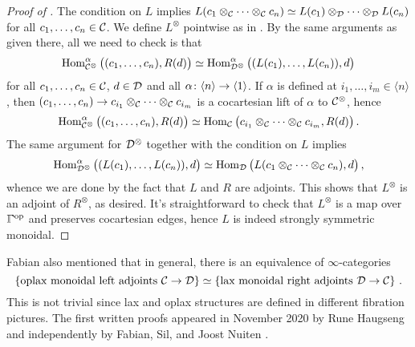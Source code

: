 \begin{proof}[Proof of ]
	The condition on $L$ implies $L(c_1\otimes_{\mathcal{C}}\dotsb\otimes_{\mathcal{C}} c_n)\simeq L(c_1)\otimes_{\mathcal{D}}\dotsb\otimes_{\mathcal{D}} L(c_n)$ for all $c_1,\dotsc,c_n\in\mathcal{C}$. We define $L^\otimes$ pointwise as in . By the same arguments as given there, all we need to check is that
	\begin{equation*}
		\operatorname{Hom}_{\mathcal{C}^\otimes}^\alpha\big((c_1,\dotsc,c_n),R(d)\big)\simeq \operatorname{Hom}_{\mathcal{D}^\otimes}^\alpha\big((L(c_1),\dotsc,L(c_n)),d\big)
	\end{equation*}
	for all $c_1,\dotsc,c_n\in\mathcal{C}$, $d\in \mathcal{D}$ and all $\alpha\colon \langle n\rangle \morphism\langle 1\rangle$. If $\alpha$ is defined at $i_1,\dotsc,i_m\in\langle n\rangle$, then $(c_1,\dotsc,c_n)\morphism c_{i_1}\otimes_\Cc\dotsb\otimes_\Cc c_{i_m}$ is a cocartesian lift of $\alpha$ to $\mathcal{C}^\otimes$, hence
	\begin{equation*}
		\operatorname{Hom}_{\mathcal{C}^\otimes}^\alpha\big((c_1,\dotsc,c_n),R(d)\big)\simeq \operatorname{Hom}_{\mathcal{C}}\big(c_{i_1}\otimes_{\mathcal{C}}\dotsb\otimes_{\mathcal{C}} c_{i_m},R(d)\big)\,.
	\end{equation*}
	The same argument for $\mathcal{D}^\otimes$ together with the condition on $L$  implies
	\begin{equation*}
		\operatorname{Hom}_{\mathcal{D}^\otimes}^\alpha\big((L(c_1),\dotsc,L(c_n)),d\big)\simeq \operatorname{Hom}_{\mathcal{D}}\big(L(c_1\otimes_{\mathcal{C}}\dotsb\otimes_{\mathcal{C}} c_n),d\big)\,,
	\end{equation*}
	whence we are done by the fact that $L$ and $R$ are adjoints. This shows that $L^\otimes$ is an adjoint of $R^\otimes$, as desired. It's straightforward to check that $L^\otimes$ is a map over $\IGamma^\op$ and preserves cocartesian edges, hence $L$ is indeed strongly symmetric monoidal.
\end{proof}
Fabian also mentioned that in general, there is an equivalence of $\infty$-categories
\begin{equation*}
	\left\{\text{oplax monoidal left adjoints $\mathcal{C}\rightarrow\mathcal{D}$}\right\}\simeq \left\{\text{lax monoidal right adjoints $\mathcal{D}\rightarrow\mathcal{C}$}\right\}\,.
\end{equation*}
This is not trivial since lax and oplax structures are defined in different fibration pictures. The first written proofs appeared in November 2020 by Rune Haugseng \cite{HaugsengLaxOplax} and independently by Fabian, Sil, and Joost Nuiten \cite{FabianSilLaxOplax}.
\label{par:DerivedTensorProduct}
